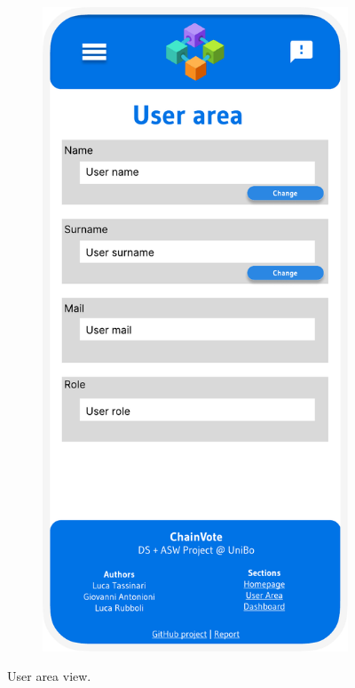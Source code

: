 \documentclass{scrartcl}
\begin{document}
\begin{figure}
    \begin{subfigure}[b]{0.3\textwidth}
        \centering
        \includegraphics[width=\textwidth]{./figures/mockups/user-area.pdf}
    \end{subfigure}
    \caption{User area view.}
    \label{fig:user-area-view}
\end{figure}
\end{document}
